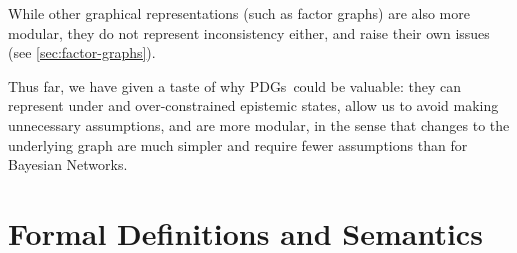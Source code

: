 \documentclass{article}
\newcommand{\MN}{PDG}
\newcommand{\MNs}{\MN s}
\begin{document}

	
	While other graphical representations (such as factor graphs) are also more modular, they do not represent inconsistency either, and raise their own issues (see \cref{sec:factor-graphs}). 
	
	Thus far, we have given a taste of why \MNs\ could be valuable: they can represent under and over-constrained epistemic states, allow us to avoid making unnecessary assumptions, and are more modular, in the sense that changes to the underlying graph are much simpler and require fewer assumptions than for Bayesian Networks.	
	
	
	



	
	
	\section{Formal Definitions and Semantics}\label{sec:formal+semantics}
	
	
\end{document}
